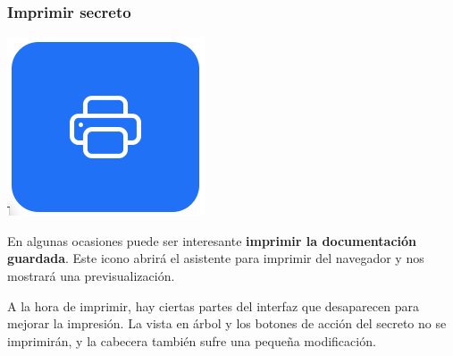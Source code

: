 \documentclass{\ClassPath/viu-tfm-template}
\begin{document}
\subsubsection*{Imprimir secreto}
{
\begin{minipage}{0.1\linewidth}
    \includegraphics[width=\linewidth]{img/print.png}
\end{minipage}
\hspace{0.5cm}
\begin{minipage}{0.9\linewidth}
    En algunas ocasiones puede ser interesante \textbf{imprimir la documentación guardada}. Este icono abrirá el asistente para imprimir del navegador y nos mostrará una previsualización.
\end{minipage}
}

A la hora de imprimir, hay ciertas partes del interfaz que desaparecen para mejorar la impresión. La vista en árbol y los botones de acción del secreto no se imprimirán, y la cabecera también sufre una pequeña modificación.
\end{document}
